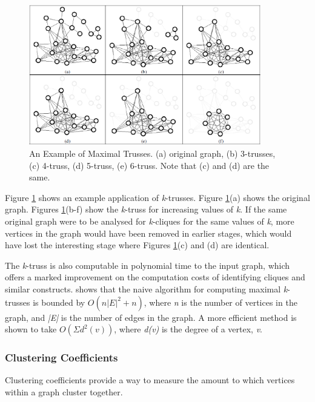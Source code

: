 \begin{figure}[htbp]
\centering
\includegraphics[width=0.9\textwidth]{./img/trusses.png}
\caption{An Example of Maximal Trusses. (a) original graph, (b) 3-trusses, (c) 4-truss, (d) 5-truss, (e) 6-truss. Note that (c) and (d) are the same. \cite{trusses}}
\label{fig:trusses}
\end{figure}

Figure \ref{fig:trusses} shows an example application of \emph{k}-trusses. Figure \ref{fig:trusses}(a) shows the original graph. Figures \ref{fig:trusses}(b-f) show the \emph{k}-truss for increasing values of \emph{k}. If the same original graph were to be analysed for \emph{k}-cliques for the same values of \emph{k}, more vertices in the graph would have been removed in earlier stages, which would have lost the interesting stage where Figures \ref{fig:trusses}(c) and (d) are identical.

The \emph{k}-truss is also computable in polynomial time to the input graph, which offers a marked improvement on the computation costs of identifying cliques and similar constructs. \cite{trusses} shows that the naive algorithm  for computing maximal \emph{k}-trusses is bounded by $O(n|E|^2 + n)$, where \emph{n} is the number of vertices in the graph, and \emph{|E|} is the number of edges in the graph. A more efficient method is shown to take $O(\Sigma d^2(v))$, where \emph{d(v)} is the degree of a vertex, \emph{v}.

\subsubsection{Clustering Coefficients}
Clustering coefficients provide a way to measure the amount to which vertices within a graph cluster together. 
